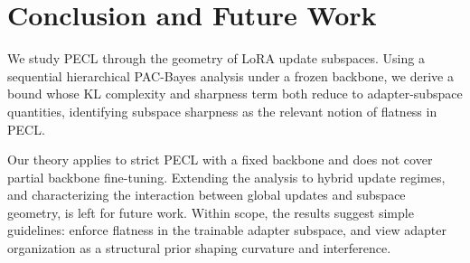 \documentclass{article}
\theoremstyle{plain}
\theoremstyle{definition}
\theoremstyle{remark}
\begin{document}







\section{Conclusion and Future Work}

We study PECL through the geometry of LoRA update subspaces. Using a sequential hierarchical PAC-Bayes analysis under a frozen backbone, we derive a bound whose KL complexity and sharpness term both reduce to adapter-subspace quantities, identifying subspace sharpness as the relevant notion of flatness in PECL. 



Our theory applies to strict PECL with a fixed backbone and does not cover partial backbone fine-tuning. Extending the analysis to hybrid update regimes, and characterizing the interaction between global updates and subspace geometry, is left for future work. Within scope, the results suggest simple guidelines: enforce flatness in the trainable adapter subspace, and view adapter organization as a structural prior shaping curvature and interference.


\end{document}
